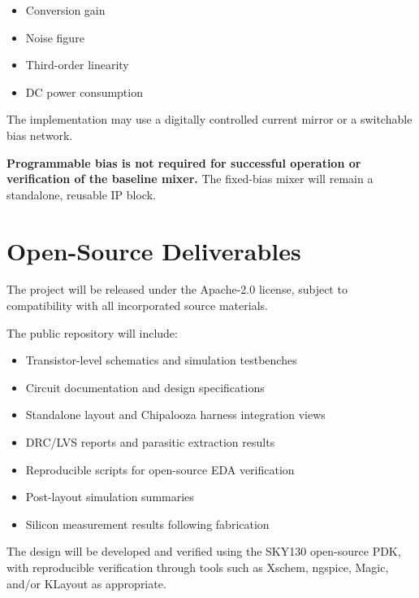 \documentclass[11pt,letterpaper]{article}
\begin{document}
\begin{itemize}
    \item Conversion gain
    \item Noise figure
    \item Third-order linearity
    \item DC power consumption
\end{itemize}

The implementation may use a digitally controlled
current mirror or a switchable bias network.

\textbf{Programmable bias is not required for successful
operation or verification of the baseline mixer.}
The fixed-bias mixer will remain a standalone,
reusable IP block.


\section{Open-Source Deliverables}

The project will be released under the Apache-2.0
license, subject to compatibility with all incorporated
source materials.

The public repository will include:

\begin{itemize}
    \item Transistor-level schematics and simulation
    testbenches

    \item Circuit documentation and design
    specifications

    \item Standalone layout and Chipalooza harness
    integration views

    \item DRC/LVS reports and parasitic extraction
    results

    \item Reproducible scripts for open-source
    EDA verification

    \item Post-layout simulation summaries

    \item Silicon measurement results following
    fabrication
\end{itemize}

The design will be developed and verified using the
SKY130 open-source PDK, with reproducible verification
through tools such as Xschem, ngspice, Magic, and/or
KLayout as appropriate.
\end{document}
